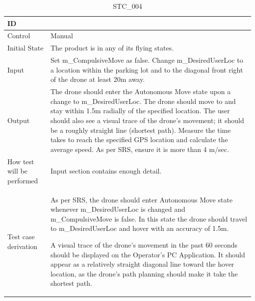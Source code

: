 \documentclass[12pt, titlepage]{article}
\begin{document}
\begin{table}[!h]
\begin{center}
\caption {STC\_004}
\label{tab:STC_004}
\begin{tabular}{ | m{3.2cm} | m{12.2cm} | } 
\hline
ID & \nameref{tab:STC_004} \\ 
\hline
Control & Manual \\ 
\hline
Initial State & The product is in any of its flying states.   \\ 
\hline
Input & Set m\_CompulsiveMove as false. Change m\_DesiredUserLoc to a location within the parking lot and to the diagonal front right of the drone at least 20m away.  \\ 
\hline
Output & The drone should enter the Autonomous Move state upon a change to m\_DesiredUserLoc. The drone should move to and stay within 1.5m radially of the specified location. 
The user should also see a visual trace of the drone's movement; it should be a roughly straight line (shortest path).
Measure the time takes to reach the specified GPS location and calculate the average speed. As per SRS, ensure it is more than 4 m/sec.  \\ 
\hline
How test will be performed & Input section contains enough detail. \\ 
\hline
Test case derivation & As per SRS, the drone should enter Autonomous Move state whenever m\_DesiredUserLoc is changed and m\_CompulsiveMove is false. In this state the drone should travel to m\_DesiredUserLoc and hover with an accuracy of 1.5m. 

A visual trace of the drone's movement in the past 60 seconds should be displayed on the Operator's PC Application. It should appear as a relatively straight diagonal line toward the hover location, as the drone's path planning should make it take the shortest path. 


\end{tabular}
\end{center}
\end{table}
\end{document}
